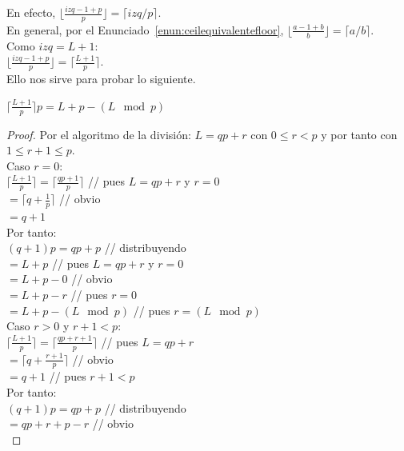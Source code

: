 En efecto, $\lfloor \frac{izq-1+p}{p} \rfloor = \lceil izq/p \rceil$.\\
En general, por el Enunciado~\ref{enun:ceilequivalentefloor},  $\lfloor \frac{a-1+b}{b} \rfloor = \lceil a/b \rceil$.\\
Como $izq=L+1$:\\
$\lfloor \frac{izq-1+p}{p} \rfloor = \lceil \frac{L+1}{p} \rceil$.\\
Ello nos sirve para probar lo siguiente.

\begin{enunciado}\label{enun:1ermultiploTecho}\leavevmode\par
$\lceil \frac{L+1}{p} \rceil p = L+p - (L \mod p)$
\end{enunciado}

\begin{proof}
Por el algoritmo de la división: $L = qp + r$ con $0 \leq r < p$ y por tanto con $1 \leq r+1 \leq p$.\\
Caso $r=0$: \\
$\lceil \frac{L+1}{p} \rceil = \lceil \frac{qp+1}{p} \rceil$ \; // pues $L = qp+r$ y $r=0$\\
$= \lceil q + \frac{1}{p} \rceil$ \; \; \; \; \; // obvio\\
$= q+1$\\
Por tanto:\\
$(q+1)p = qp+p$ \; \; \; \; \; \; \; // distribuyendo\\
$= L+p$ \; \; \; \; \; \; \; \; \; \; \; \;  \; \; \; // pues $L = qp+r$ y $r=0$\\
$= L+p - 0$  \; \; \; \; \; \; \; \; \;  \; \; \; // obvio\\
$= L+p - r$ \; \;  \; \; \; \; \; \; \; \; \; \; \;// pues $r=0$\\
$= L+p - (L \mod p)$\; \; \; \; // pues $r = (L \mod p)$\\
Caso $r>0$ y $r+1 < p$: \\
$\lceil \frac{L+1}{p} \rceil = \lceil \frac{qp+r+1}{p} \rceil$ \; \; \; \; \; \; \; \;// pues $L = qp+r$ \\
$= \lceil q + \frac{r+1}{p} \rceil$  \; \; \; \;  \; \; \; \;  \; \; \; \; // obvio  \\
$= q+1$  \; \; \; \;  \; \; \; \;  \; \; \; \;  \; \; \; \;// pues $r+1 < p$  \\
Por tanto: \\
$(q+1)p = qp+p$  \; \; \; \;  \; \; \; // distribuyendo \\
$= qp+r+p-r$  \; \; \; \;  \; \; \; \;  \;  // obvio  \\


\end{proof}
